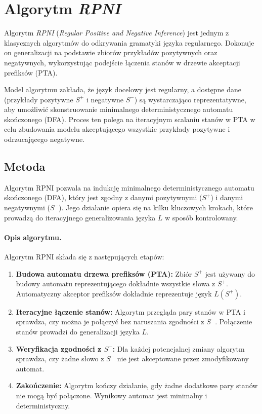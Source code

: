 \section{Algorytm \textit{RPNI}}
\label{sec:rpni}

Algorytm \textit{RPNI} (\textit{Regular Positive and Negative Inference}) \cite{RPNI} jest jednym z klasycznych algorytmów do odkrywania gramatyki języka regularnego. Dokonuje on generalizacji na podstawie zbiorów przykładów pozytywnych oraz negatywnych, wykorzystując podejście łączenia stanów w drzewie akceptacji prefiksów (PTA).

Model algorytmu zakłada, że język docelowy jest regularny, a dostępne dane (przykłady pozytywne \( S^+ \) i negatywne \( S^- \)) są wystarczająco reprezentatywne, aby umożliwić skonstruowanie minimalnego deterministycznego automatu skończonego (DFA). Proces ten polega na iteracyjnym scalaniu stanów w PTA w celu zbudowania modelu akceptującego wszystkie przykłady pozytywne i odrzucającego negatywne.

\subsection{Metoda}

Algorytm RPNI pozwala na indukcję minimalnego deterministycznego automatu skończonego (DFA), który jest zgodny z danymi pozytywnymi (\( S^+ \)) i danymi negatywnymi (\( S^- \)). Jego działanie opiera się na kilku kluczowych krokach, które prowadzą do iteracyjnego generalizowania języka \( L \) w sposób kontrolowany.

\paragraph*{Opis algorytmu.}
Algorytm RPNI składa się z następujących etapów:
\begin{enumerate}
    \item \textbf{Budowa automatu drzewa prefiksów (PTA):}
        Zbiór \( S^+ \) jest używany do budowy automatu reprezentującego dokładnie wszystkie słowa z \( S^+ \). Automatyczny akceptor prefiksów dokładnie reprezentuje język \( L(S^+) \).
    \item \textbf{Iteracyjne łączenie stanów:}
        Algorytm przegląda pary stanów w PTA i sprawdza, czy można je połączyć bez naruszania zgodności z \( S^- \). Połączenie stanów prowadzi do generalizacji języka \( L \).
    \item \textbf{Weryfikacja zgodności z \( S^- \):}
        Dla każdej potencjalnej zmiany algorytm sprawdza, czy żadne słowo z \( S^- \) nie jest akceptowane przez zmodyfikowany automat.
    \item \textbf{Zakończenie:} 
        Algorytm kończy działanie, gdy żadne dodatkowe pary stanów nie mogą być połączone. Wynikowy automat jest minimalny i deterministyczny.
\end{enumerate}

